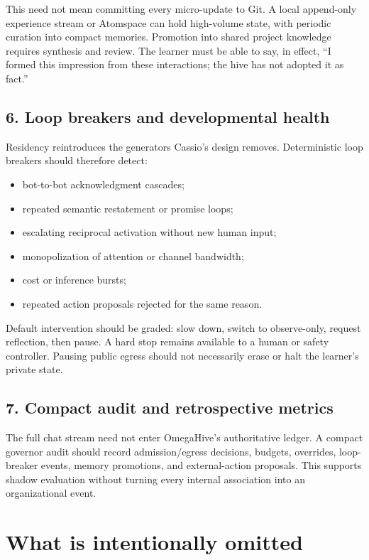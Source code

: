 \documentclass[11pt]{article}
\begin{document}
This need not mean committing every micro-update to Git. A local append-only
experience stream or Atomspace can hold high-volume state, with periodic
curation into compact memories. Promotion into shared project knowledge
requires synthesis and review. The learner must be able to say, in effect,
``I formed this impression from these interactions; the hive has not adopted
it as fact.''

\subsection{6. Loop breakers and developmental health}

Residency reintroduces the generators Cassio's design removes. Deterministic
loop breakers should therefore detect:

\begin{itemize}
  \item bot-to-bot acknowledgment cascades;
  \item repeated semantic restatement or promise loops;
  \item escalating reciprocal activation without new human input;
  \item monopolization of attention or channel bandwidth;
  \item cost or inference bursts;
  \item repeated action proposals rejected for the same reason.
\end{itemize}

Default intervention should be graded: slow down, switch to observe-only,
request reflection, then pause. A hard stop remains available to a human or
safety controller. Pausing public egress should not necessarily erase or halt
the learner's private state.

\subsection{7. Compact audit and retrospective metrics}

The full chat stream need not enter OmegaHive's authoritative ledger. A compact
governor audit should record admission/egress decisions, budgets, overrides,
loop-breaker events, memory promotions, and external-action proposals. This
supports shadow evaluation without turning every internal association into an
organizational event.

\section{What is intentionally omitted}
\end{document}
